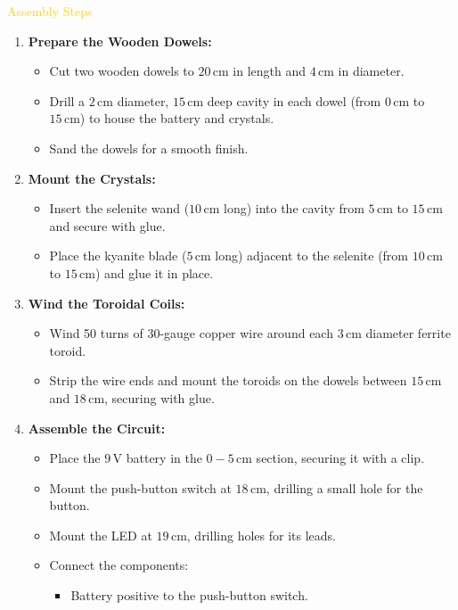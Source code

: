 \textcolor{gold}{ Assembly Steps }
\begin{enumerate}
    \item \textbf{Prepare the Wooden Dowels:}
    \begin{itemize}
        \item Cut two wooden dowels to $20\,\mathrm{cm}$ in length and $4\,\mathrm{cm}$ in diameter.
        \item Drill a $2\,\mathrm{cm}$ diameter, $15\,\mathrm{cm}$ deep cavity in each dowel (from $0\,\mathrm{cm}$ to $15\,\mathrm{cm}$) to house the battery and crystals.
        \item Sand the dowels for a smooth finish.
    \end{itemize}
    \item \textbf{Mount the Crystals:}
    \begin{itemize}
        \item Insert the selenite wand ($10\,\mathrm{cm}$ long) into the cavity from $5\,\mathrm{cm}$ to $15\,\mathrm{cm}$ and secure with glue.
        \item Place the kyanite blade ($5\,\mathrm{cm}$ long) adjacent to the selenite (from $10\,\mathrm{cm}$ to $15\,\mathrm{cm}$) and glue it in place.
    \end{itemize}
    \item \textbf{Wind the Toroidal Coils:}
    \begin{itemize}
        \item Wind 50 turns of 30-gauge copper wire around each $3\,\mathrm{cm}$ diameter ferrite toroid.
        \item Strip the wire ends and mount the toroids on the dowels between $15\,\mathrm{cm}$ and $18\,\mathrm{cm}$, securing with glue.
    \end{itemize}
    \item \textbf{Assemble the Circuit:}
    \begin{itemize}
        \item Place the $9\,\mathrm{V}$ battery in the $0-5\,\mathrm{cm}$ section, securing it with a clip.
        \item Mount the push-button switch at $18\,\mathrm{cm}$, drilling a small hole for the button.
        \item Mount the LED at $19\,\mathrm{cm}$, drilling holes for its leads.
        \item Connect the components:
        \begin{itemize}
            \item Battery positive to the push-button switch.

\end{itemize}
\end{itemize}
\end{enumerate}
